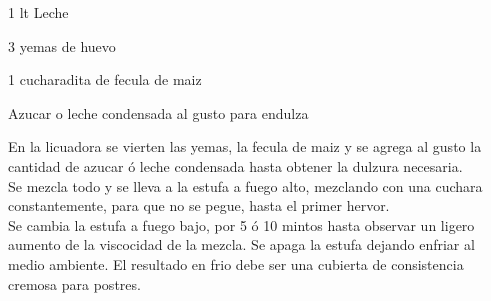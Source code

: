 

\begin{ingredientes}
\item 1 lt Leche
\item 3 yemas de huevo
\item 1 cucharadita de fecula de maiz
\item Azucar o leche condensada al gusto para endulza
\end{ingredientes}
\preparacion
En la licuadora se vierten las yemas, la fecula de maiz y se agrega al gusto la cantidad de azucar ó leche condensada hasta obtener la dulzura necesaria.\\

Se mezcla todo y se lleva a la estufa a fuego alto, mezclando con una cuchara constantemente, para que no se pegue, hasta el primer hervor.\\

Se cambia la estufa a fuego bajo, por 5 ó 10 mintos hasta observar un ligero aumento de la viscocidad de la mezcla. Se apaga la estufa dejando enfriar al medio ambiente. El resultado en frio debe ser una cubierta de consistencia cremosa para postres.